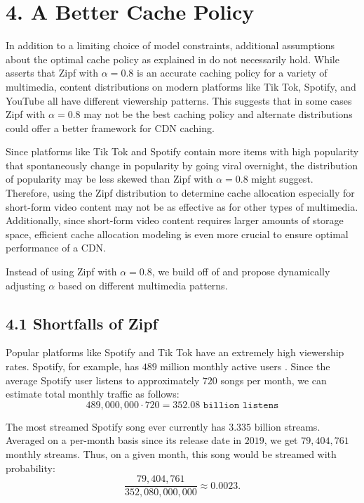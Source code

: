 \documentclass[
	a4paper, %
	10pt, %
	unnumberedsections, %
	twoside, %
]{LTJournalArticle}
\begin{document}
\section{4. A Better Cache Policy}

In addition to a limiting choice of model constraints, additional assumptions about the optimal cache policy as explained in \cite{biancoCDNs2017} do not necessarily hold. While \cite{biancoCDNs2017} asserts that Zipf with $\alpha = 0.8$ is an accurate caching policy for a variety of multimedia, content distributions on modern platforms like Tik Tok, Spotify, and YouTube all have different viewership patterns. This suggests that in some cases Zipf with $\alpha = 0.8$ may not be the best caching policy and alternate distributions could offer a better framework for CDN caching. 

Since platforms like Tik Tok and Spotify contain more items with high popularity that spontaneously change in popularity by going viral overnight, the distribution of popularity may be less skewed than Zipf with $\alpha = 0.8$ might suggest. Therefore, using the Zipf distribution to determine cache allocation especially for short-form video content may not be as effective as for other types of multimedia. Additionally, since short-form video content requires larger amounts of storage space, efficient cache allocation modeling is even more crucial to ensure optimal performance of a CDN. 

Instead of using Zipf with $\alpha = 0.8$, we build off of \cite{osmanthesis} and propose dynamically adjusting $\alpha$ based on different multimedia patterns. 

\subsection{4.1 Shortfalls of Zipf}

Popular platforms like Spotify and Tik Tok have an extremely high viewership rates. Spotify, for example, has $489$ million monthly active users \cite{headphonesaddict_2023}. Since the average Spotify user listens to approximately $720$ songs per month, we can estimate total monthly traffic as follows: 
\[
	489,000,000 \cdot 720 = 352.08 \texttt{ billion listens}
\]  
	
The most streamed Spotify song ever currently has $3.335$ billion streams. Averaged on a per-month basis since its release date in $2019$, we get $79,404,761$ monthly streams. Thus, on a given month, this song would be streamed with probability: 
\[
	\frac{79,404,761}{352,080,000,000} \approx 0.0023.
\] 
\end{document}
